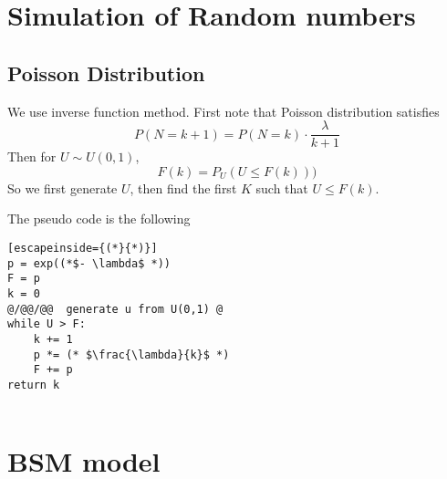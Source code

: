 \documentclass[12pt]{amsart}
\theoremstyle{definition}
\theoremstyle{remark}
\begin{document}
\allowdisplaybreaks
\tableofcontents
\title{}

\author{}



\dedicatory{}

\keywords{}

\maketitle

\section{Simulation of Random numbers}
\subsection{Poisson Distribution}

We use inverse function method.
First note that Poisson distribution satisfies 
\begin{equation*}
P(N= k+1) = P(N= k)\cdot \frac{\lambda}{k+1}
\end{equation*}
Then for $U\sim U(0,1)$, 
\begin{equation*}
F(k) = P_U(U\le F(k)))
\end{equation*}
So we first generate $U$, then find the first $K$ such that $U\le F(k)$.

The pseudo code is the following

\begin{lstlisting}[escapeinside={(*}{*)}]
p = exp((*$- \lambda$ *))
F = p
k = 0
@/@@/@@  generate u from U(0,1) @  
while U > F:
	k += 1
	p *= (* $\frac{\lambda}{k}$ *)
	F += p
return k	


\end{lstlisting}



\section{BSM model}
\end{document}
